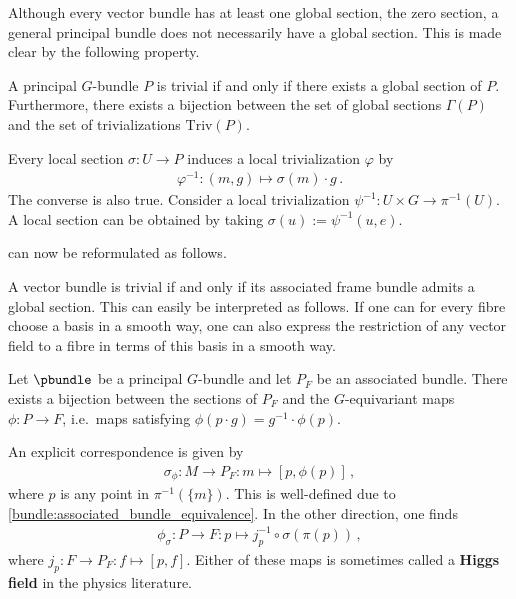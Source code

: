     Although every vector bundle has at least one global section, the zero section, a general principal bundle does not necessarily have a global section. This is made clear by the following property.
    \begin{property}
        A principal $G$-bundle $P$ is trivial if and only if there exists a global section of $P$. Furthermore, there exists a bijection between the set of global sections $\Gamma(P)$ and the set of trivializations $\mathrm{Triv}(P)$.
    \end{property}
    \begin{result}\label{bundle:prin_section_triv}
        Every local section $\sigma:U\rightarrow P$ induces a local trivialization $\varphi$ by
        \begin{gather}
            \varphi^{-1}:(m,g)\mapsto\sigma(m)\cdot g\,.
        \end{gather}
        The converse is also true. Consider a local trivialization $\psi^{-1}:U\times G\rightarrow\pi^{-1}(U)$. A local section can be obtained by taking $\sigma(u):=\psi^{-1}(u,e)$.
    \end{result}

     can now be reformulated as follows.
    \begin{property}
        A vector bundle is trivial if and only if its associated frame bundle admits a global section. This can easily be interpreted as follows. If one can for every fibre choose a basis in a smooth way, one can also express the restriction of any vector field to a fibre in terms of this basis in a smooth way.
    \end{property}

    \begin{property}\label{bundle:section_bijection}
        Let $\pbundle$ be a principal $G$-bundle and let $P_F$ be an associated bundle. There exists a bijection between the sections of $P_F$ and the $G$-equivariant maps $\phi:P\rightarrow F$, i.e.~maps satisfying $\phi(p\cdot g)=g^{-1}\cdot\phi(p)$.

        An explicit correspondence is given by
        \begin{gather}
            \sigma_\phi:M\rightarrow P_F:m\mapsto[p,\phi(p)]\,,
        \end{gather}
        where $p$ is any point in $\pi^{-1}(\{m\})$. This is well-defined due to \cref{bundle:associated_bundle_equivalence}. In the other direction, one finds
        \begin{gather}
            \label{bundle:section_bijection_phi}
            \phi_\sigma:P\rightarrow F:p\mapsto j_p^{-1}\circ\sigma(\pi(p))\,,
        \end{gather}
        where $j_p:F\rightarrow P_F:f\mapsto[p,f]$. Either of these maps is sometimes called a \textbf{Higgs field} in the physics literature.
    \end{property}

